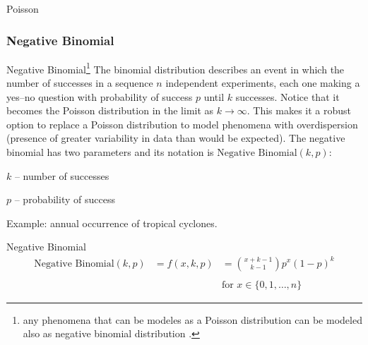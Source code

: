 \begin{frame}{Poisson}
	\centering
\end{frame}

\subsubsection{Negative Binomial}
\begin{frame}{Negative Binomial\footnote{
			any phenomena that can be modeles as a Poisson distribution can be
			modeled also as negative binomial distribution
			\parencite{gelman2013bayesian, gelman2020regression}.}}
	\small
	The binomial distribution describes an event in which the number of
	successes in a sequence $n$ independent experiments,
	each one making a yes--no question with probability of success $p$
	until $k$ successes.
	Notice that it becomes the Poisson distribution in the limit as $k \to \infty$.
	This makes it a robust option to replace a Poisson distribution to model
	phenomena with overdispersion
	(presence of greater variability in data than would be expected).
	\vfill \small
	The negative binomial has two parameters and its notation is
	$\text{Negative Binomial}(k, p)$:
	\begin{vfilleditems}
		\small
		\item $k$ -- number of successes
		\item $p$ -- probability of success
	\end{vfilleditems}
	\vfil \small
	Example: annual occurrence of tropical cyclones.
\end{frame}

\begin{frame}{Negative Binomial}
	$$
		\begin{aligned}
			\text{Negative Binomial}(k, p) & = f(x, k, p) & = \binom{x + k - 1}{k - 1}p^{x}(1-p)^{k} \\
			\\
			                               & ~            & \text{for $x \in \{0, 1, \dots, n\}$}
		\end{aligned}
	$$
\end{frame}

